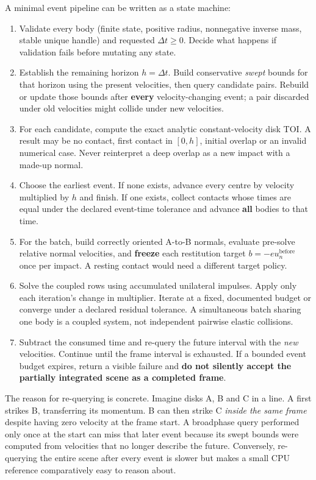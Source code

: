 A minimal event pipeline can be written as a state machine:

\begin{enumerate}
\def\labelenumi{\arabic{enumi}.}
\tightlist
\item
  Validate every body (finite state, positive radius, nonnegative inverse mass, stable unique handle) and requested \(\Delta t\ge0\). Decide what happens if validation fails before mutating any state.
\item
  Establish the remaining horizon \(h=\Delta t\). Build conservative \emph{swept} bounds for that horizon using the present velocities, then query candidate pairs. Rebuild or update those bounds after \textbf{every} velocity-changing event; a pair discarded under old velocities might collide under new velocities.
\item
  For each candidate, compute the exact analytic constant-velocity disk TOI. A result may be no contact, first contact in \([0,h]\), initial overlap or an invalid numerical case. Never reinterpret a deep overlap as a new impact with a made-up normal.
\item
  Choose the earliest event. If none exists, advance every centre by velocity multiplied by \(h\) and finish. If one exists, collect contacts whose times are equal under the declared event-time tolerance and advance \textbf{all} bodies to that time.
\item
  For the batch, build correctly oriented A-to-B normals, evaluate pre-solve relative normal velocities, and \textbf{freeze} each restitution target \(b=-e u_n^{\mathrm{before}}\) once per impact. A resting contact would need a different target policy.
\item
  Solve the coupled rows using accumulated unilateral impulses. Apply only each iteration's change in multiplier. Iterate at a fixed, documented budget or converge under a declared residual tolerance. A simultaneous batch sharing one body is a coupled system, not independent pairwise elastic collisions.
\item
  Subtract the consumed time and re-query the future interval with the \emph{new} velocities. Continue until the frame interval is exhausted. If a bounded event budget expires, return a visible failure and \textbf{do not silently accept the partially integrated scene as a completed frame}.
\end{enumerate}

The reason for re-querying is concrete. Imagine disks A, B and C in a line. A first strikes B, transferring its momentum. B can then strike C \emph{inside the same frame} despite having zero velocity at the frame start. A broadphase query performed only once at the start can miss that later event because its swept bounds were computed from velocities that no longer describe the future. Conversely, re-querying the entire scene after every event is slower but makes a small CPU reference comparatively easy to reason about.

